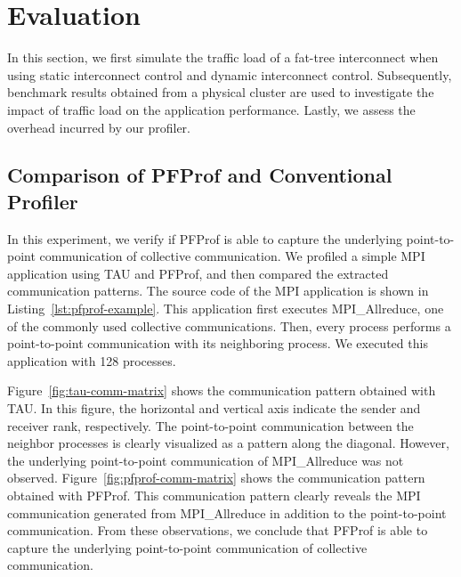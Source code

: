 \section{Evaluation}\label{sec:ii-evaluation}

In this section, we first simulate the traffic load of a fat-tree
interconnect when using static interconnect control and dynamic
interconnect control. Subsequently, benchmark results obtained from a
physical cluster are used to investigate the impact of traffic load on
the application performance. Lastly, we assess the overhead incurred by
our profiler.

\subsection{Comparison of PFProf and Conventional Profiler}%
\label{sec:ii-eval-pfprof}

In this experiment, we verify if PFProf is able to capture the underlying
point-to-point communication of collective communication. We profiled a simple
MPI application using  TAU and PFProf, and then compared the extracted
communication patterns. The source code of the MPI application is shown in
Listing~\ref{lst:pfprof-example}. This application first executes
MPI\_Allreduce, one of the commonly used collective communications. Then,
every process performs a point-to-point communication with its neighboring
process. We executed this application with 128 processes.

Figure~\ref{fig:tau-comm-matrix} shows the communication pattern obtained with
TAU\@. In this figure, the horizontal and vertical axis indicate the sender and
receiver rank, respectively. The point-to-point communication between the
neighbor processes is clearly visualized as  a pattern along the diagonal.
However, the underlying point-to-point communication of MPI\_Allreduce was not
observed. Figure~\ref{fig:pfprof-comm-matrix} shows the communication pattern
obtained with PFProf. This communication pattern clearly reveals the MPI
communication generated from MPI\_Allreduce in addition to the point-to-point
communication. From these observations, we conclude that PFProf is able to
capture the underlying point-to-point communication of collective
communication.

